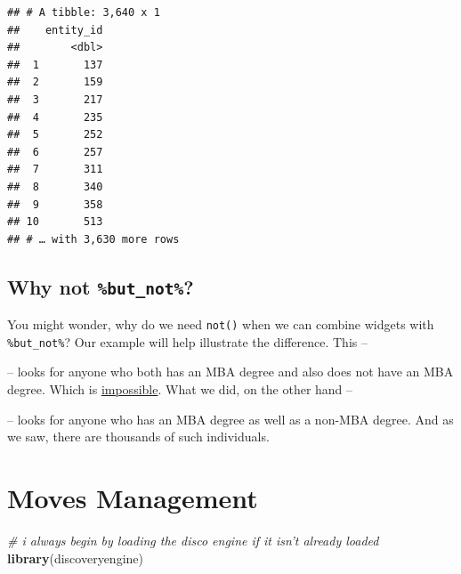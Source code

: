 \documentclass[]{book}
\newenvironment{Shaded}{\begin{snugshade}}{\end{snugshade}}
\newcommand{\CommentTok}[1]{\textcolor[rgb]{0.56,0.35,0.01}{\textit{#1}}}
\newcommand{\KeywordTok}[1]{\textcolor[rgb]{0.13,0.29,0.53}{\textbf{#1}}}
\newcommand{\NormalTok}[1]{#1}
\newcommand{\OperatorTok}[1]{\textcolor[rgb]{0.81,0.36,0.00}{\textbf{#1}}}
\newcommand{\StringTok}[1]{\textcolor[rgb]{0.31,0.60,0.02}{#1}}
\begin{document}
\begin{verbatim}
## # A tibble: 3,640 x 1
##    entity_id
##        <dbl>
##  1       137
##  2       159
##  3       217
##  4       235
##  5       252
##  6       257
##  7       311
##  8       340
##  9       358
## 10       513
## # … with 3,630 more rows
\end{verbatim}

\hypertarget{why-not-but_not}{%
\section{\texorpdfstring{Why not \texttt{\%but\_not\%}?}{Why not \%but\_not\%?}}\label{why-not-but_not}}

You might wonder, why do we need \texttt{not()} when we can combine widgets with \texttt{\%but\_not\%}? Our example will help illustrate the difference. This --

\begin{Shaded}
\end{Shaded}

-- looks for anyone who both has an MBA degree and also does not have an MBA degree. Which is \href{https://en.wikipedia.org/wiki/Law_of_excluded_middle}{impossible}. What we did, on the other hand --

\begin{Shaded}
\end{Shaded}

-- looks for anyone who has an MBA degree as well as a non-MBA degree. And as we saw, there are thousands of such individuals.

\hypertarget{ex-moves-management}{%
\chapter{Moves Management}\label{ex-moves-management}}

\begin{Shaded}
\begin{Highlighting}[]
\CommentTok{# i always begin by loading the disco engine if it isn't already loaded}
\KeywordTok{library}\NormalTok{(discoveryengine)}
\end{Highlighting}
\end{Shaded}
\end{document}

